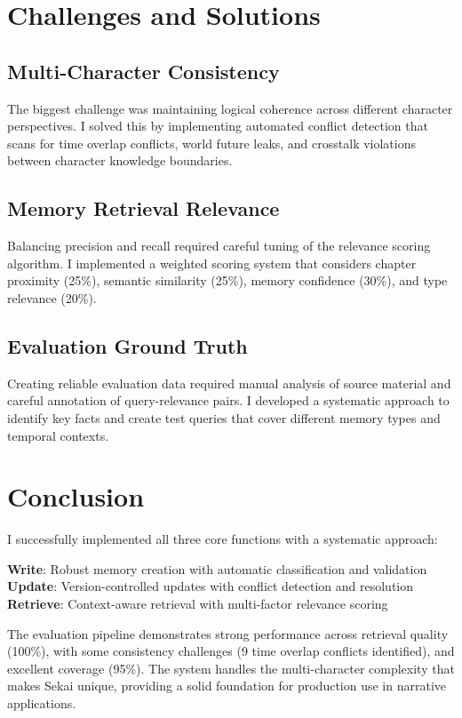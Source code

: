\documentclass[11pt,a4paper]{article}
\begin{document}
\section{Challenges and Solutions}

\subsection{Multi-Character Consistency}

The biggest challenge was maintaining logical coherence across different character perspectives. I solved this by implementing automated conflict detection that scans for time overlap conflicts, world future leaks, and crosstalk violations between character knowledge boundaries.

\subsection{Memory Retrieval Relevance}

Balancing precision and recall required careful tuning of the relevance scoring algorithm. I implemented a weighted scoring system that considers chapter proximity (25\%), semantic similarity (25\%), memory confidence (30\%), and type relevance (20\%).

\subsection{Evaluation Ground Truth}

Creating reliable evaluation data required manual analysis of source material and careful annotation of query-relevance pairs. I developed a systematic approach to identify key facts and create test queries that cover different memory types and temporal contexts.

\section{Conclusion}

I successfully implemented all three core functions with a systematic approach:

\textbf{Write}: Robust memory creation with automatic classification and validation
\textbf{Update}: Version-controlled updates with conflict detection and resolution  
\textbf{Retrieve}: Context-aware retrieval with multi-factor relevance scoring

The evaluation pipeline demonstrates strong performance across retrieval quality (100\%), with some consistency challenges (9 time overlap conflicts identified), and excellent coverage (95\%). The system handles the multi-character complexity that makes Sekai unique, providing a solid foundation for production use in narrative applications.
\end{document}
